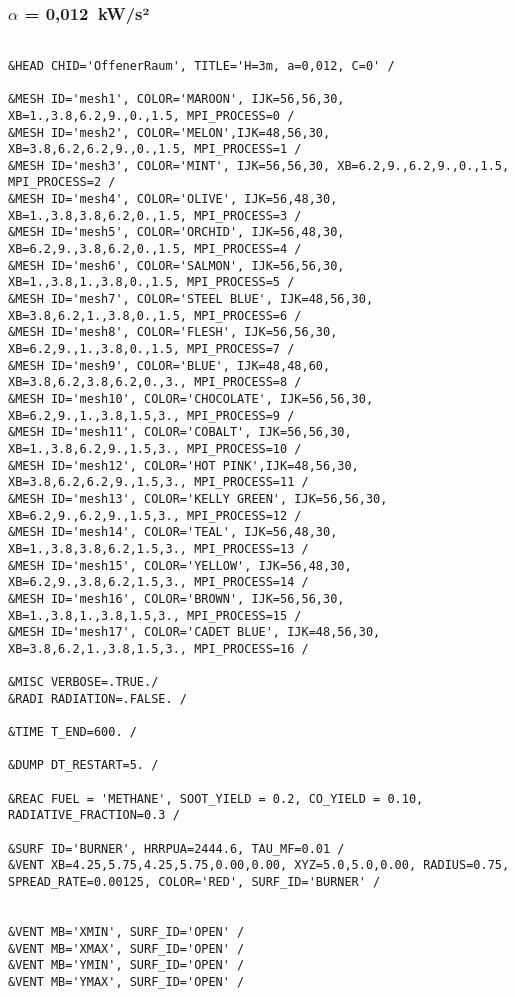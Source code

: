 \subsubsection{$\alpha$ = 0,012~kW/s²}
\begin{lstlisting}[emptylines=0, basicstyle=\tiny]
    
&HEAD CHID='OffenerRaum', TITLE='H=3m, a=0,012, C=0' /

&MESH ID='mesh1', COLOR='MAROON', IJK=56,56,30, XB=1.,3.8,6.2,9.,0.,1.5, MPI_PROCESS=0 /
&MESH ID='mesh2', COLOR='MELON',IJK=48,56,30, XB=3.8,6.2,6.2,9.,0.,1.5, MPI_PROCESS=1 /
&MESH ID='mesh3', COLOR='MINT', IJK=56,56,30, XB=6.2,9.,6.2,9.,0.,1.5, MPI_PROCESS=2 /
&MESH ID='mesh4', COLOR='OLIVE', IJK=56,48,30, XB=1.,3.8,3.8,6.2,0.,1.5, MPI_PROCESS=3 /
&MESH ID='mesh5', COLOR='ORCHID', IJK=56,48,30, XB=6.2,9.,3.8,6.2,0.,1.5, MPI_PROCESS=4 /
&MESH ID='mesh6', COLOR='SALMON', IJK=56,56,30, XB=1.,3.8,1.,3.8,0.,1.5, MPI_PROCESS=5 /
&MESH ID='mesh7', COLOR='STEEL BLUE', IJK=48,56,30, XB=3.8,6.2,1.,3.8,0.,1.5, MPI_PROCESS=6 /
&MESH ID='mesh8', COLOR='FLESH', IJK=56,56,30, XB=6.2,9.,1.,3.8,0.,1.5, MPI_PROCESS=7 /
&MESH ID='mesh9', COLOR='BLUE', IJK=48,48,60, XB=3.8,6.2,3.8,6.2,0.,3., MPI_PROCESS=8 /
&MESH ID='mesh10', COLOR='CHOCOLATE', IJK=56,56,30, XB=6.2,9.,1.,3.8,1.5,3., MPI_PROCESS=9 /
&MESH ID='mesh11', COLOR='COBALT', IJK=56,56,30, XB=1.,3.8,6.2,9.,1.5,3., MPI_PROCESS=10 /
&MESH ID='mesh12', COLOR='HOT PINK',IJK=48,56,30, XB=3.8,6.2,6.2,9.,1.5,3., MPI_PROCESS=11 /
&MESH ID='mesh13', COLOR='KELLY GREEN', IJK=56,56,30, XB=6.2,9.,6.2,9.,1.5,3., MPI_PROCESS=12 /
&MESH ID='mesh14', COLOR='TEAL', IJK=56,48,30, XB=1.,3.8,3.8,6.2,1.5,3., MPI_PROCESS=13 /
&MESH ID='mesh15', COLOR='YELLOW', IJK=56,48,30, XB=6.2,9.,3.8,6.2,1.5,3., MPI_PROCESS=14 /
&MESH ID='mesh16', COLOR='BROWN', IJK=56,56,30, XB=1.,3.8,1.,3.8,1.5,3., MPI_PROCESS=15 /
&MESH ID='mesh17', COLOR='CADET BLUE', IJK=48,56,30, XB=3.8,6.2,1.,3.8,1.5,3., MPI_PROCESS=16 /

&MISC VERBOSE=.TRUE./
&RADI RADIATION=.FALSE. /

&TIME T_END=600. /

&DUMP DT_RESTART=5. /

&REAC FUEL = 'METHANE', SOOT_YIELD = 0.2, CO_YIELD = 0.10, RADIATIVE_FRACTION=0.3 /

&SURF ID='BURNER', HRRPUA=2444.6, TAU_MF=0.01 /
&VENT XB=4.25,5.75,4.25,5.75,0.00,0.00, XYZ=5.0,5.0,0.00, RADIUS=0.75, SPREAD_RATE=0.00125, COLOR='RED', SURF_ID='BURNER' /


&VENT MB='XMIN', SURF_ID='OPEN' /  
&VENT MB='XMAX', SURF_ID='OPEN' /  
&VENT MB='YMIN', SURF_ID='OPEN' /  
&VENT MB='YMAX', SURF_ID='OPEN' / 
 

\end{lstlisting}
